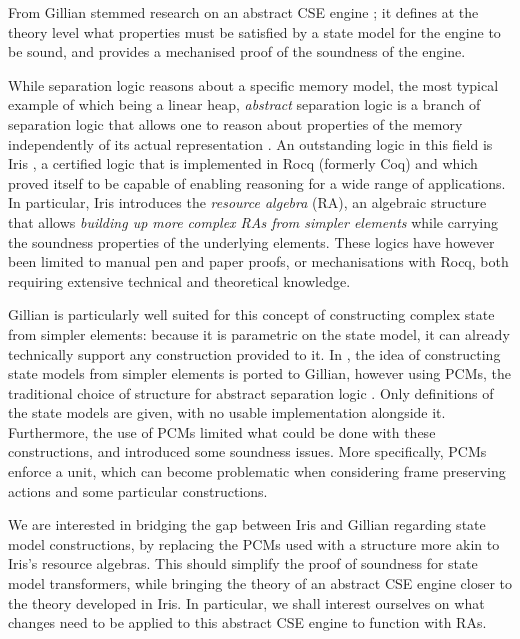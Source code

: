 From Gillian stemmed research on an abstract CSE engine \cite{cse1,cse2}; it defines at the theory level what properties must be satisfied by a state model for the engine to be sound, and provides a mechanised proof of the soundness of the engine.

While separation logic reasons about a specific memory model, the most typical example of which being a linear heap, \emph{abstract} separation logic is a branch of separation logic that allows one to reason about properties of the memory independently of its actual representation \cite{higherorderseplogic,abstractseplogic}. An outstanding logic in this field is Iris \cite{iris}, a certified logic that is implemented in Rocq (formerly Coq) \cite{coq} and which proved itself to be capable of enabling reasoning for a wide range of applications. In particular, Iris introduces the \emph{resource algebra} (RA), an algebraic structure that allows \emph{building up more complex RAs from simpler elements} while carrying the soundness properties of the underlying elements. These logics have however been limited to manual pen and paper proofs, or mechanisations with Rocq, both requiring extensive technical and theoretical knowledge.

Gillian is particularly well suited for this concept of constructing complex state from simpler elements: because it is parametric on the state model, it can already technically support any construction provided to it. In \cite{sacha-phd}, the idea of constructing state models from simpler elements is ported to Gillian, however using PCMs, the traditional choice of structure for abstract separation logic \cite{abstractseplogic,sepalgebra,iris1,higherorderseplogic}. Only definitions of the state models are given, with no usable implementation alongside it. Furthermore, the use of PCMs limited what could be done with these constructions, and introduced some soundness issues. More specifically, PCMs enforce a unit, which can become problematic when considering frame preserving actions and some particular constructions.

We are interested in bridging the gap between Iris and Gillian regarding state model constructions, by replacing the PCMs used with a structure more akin to Iris's resource algebras. This should simplify the proof of soundness for state model transformers, while bringing the theory of an abstract CSE engine closer to the theory developed in Iris. In particular, we shall interest ourselves on what changes need to be applied to this abstract CSE engine to function with RAs.

